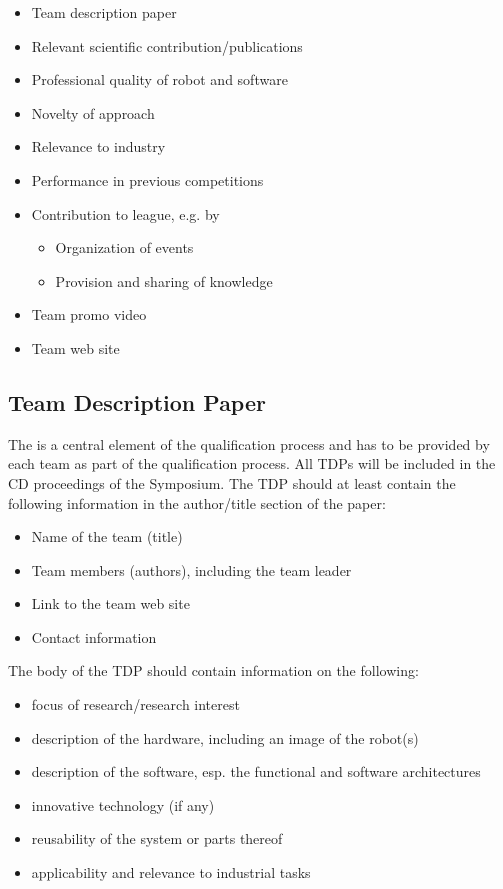 \begin{itemize}

	\item Team description paper
	\item Relevant scientific contribution/publications
	\item Professional quality of robot and software
	\item Novelty of approach
	\item Relevance to industry
	\item Performance in previous competitions
	\item Contribution to \RCAW league, e.g. by
		\begin{itemize}
			\item Organization of events
			\item Provision and sharing of knowledge
		\end{itemize}
	\item Team promo video
	\item Team web site

\end{itemize}

\subsection{Team Description Paper}
The  is a central element of the qualification process and has to be provided by each team as part of the qualification process. All TDPs will be included in the CD proceedings of the \RC Symposium.
The TDP should at least contain the following information in the author/title section of the paper:

\begin{itemize}
	\item Name of the team (title)
	\item Team members (authors), including the team leader
	\item Link to the team web site
	\item Contact information
\end{itemize}


The body of the TDP should contain information on the following:

\begin{itemize}
	\item focus of research/research interest
	\item description of the hardware, including an image of the robot(s)
	\item description of the software, esp. the functional and software architectures
	\item innovative technology (if any)
	\item reusability of the system or parts thereof
	\item applicability and relevance to industrial tasks
\end{itemize}

